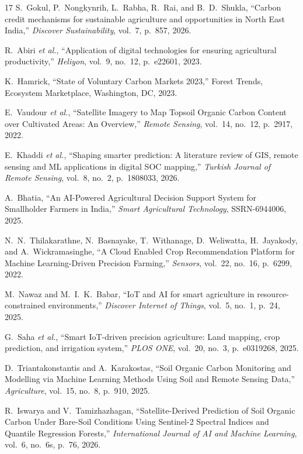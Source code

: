 \documentclass[10pt,a4paper,twocolumn]{IEEEtran}
\begin{document}
\begin{thebibliography}{17}
S.~Gokul, P.~Nongkynrih, L.~Rabha, R.~Rai, and B.~D.~Shukla, ``Carbon credit mechanisms for sustainable agriculture and opportunities in North East India,'' \emph{Discover Sustainability}, vol.~7, p.~857, 2026.

R.~Abiri \emph{et al.}, ``Application of digital technologies for ensuring agricultural productivity,'' \emph{Heliyon}, vol.~9, no.~12, p.~e22601, 2023.

K.~Hamrick, ``State of Voluntary Carbon Markets 2023,'' Forest Trends, Ecosystem Marketplace, Washington, DC, 2023.

E.~Vaudour \emph{et al.}, ``Satellite Imagery to Map Topsoil Organic Carbon Content over Cultivated Areas: An Overview,'' \emph{Remote Sensing}, vol.~14, no.~12, p.~2917, 2022.

E.~Khaddi \emph{et al.}, ``Shaping smarter prediction: A literature review of GIS, remote sensing and ML applications in digital SOC mapping,'' \emph{Turkish Journal of Remote Sensing}, vol.~8, no.~2, p.~1808033, 2026.

A.~Bhatia, ``An AI-Powered Agricultural Decision Support System for Smallholder Farmers in India,'' \emph{Smart Agricultural Technology}, SSRN-6944006, 2025.

N.~N.~Thilakarathne, N.~Basnayake, T.~Withanage, D.~Weliwatta, H.~Jayakody, and A.~Wickramasinghe, ``A Cloud Enabled Crop Recommendation Platform for Machine Learning-Driven Precision Farming,'' \emph{Sensors}, vol.~22, no.~16, p.~6299, 2022.

M.~Nawaz and M.~I.~K.~Babar, ``IoT and AI for smart agriculture in resource-constrained environments,'' \emph{Discover Internet of Things}, vol.~5, no.~1, p.~24, 2025.

G.~Saha \emph{et al.}, ``Smart IoT-driven precision agriculture: Land mapping, crop prediction, and irrigation system,'' \emph{PLOS ONE}, vol.~20, no.~3, p.~e0319268, 2025.

D.~Triantakonstantis and A.~Karakostas, ``Soil Organic Carbon Monitoring and Modelling via Machine Learning Methods Using Soil and Remote Sensing Data,'' \emph{Agriculture}, vol.~15, no.~8, p.~910, 2025.

R.~Iswarya and V.~Tamizhazhagan, ``Satellite-Derived Prediction of Soil Organic Carbon Under Bare-Soil Conditions Using Sentinel-2 Spectral Indices and Quantile Regression Forests,'' \emph{International Journal of AI and Machine Learning}, vol.~6, no.~6s, p.~76, 2026.


\end{thebibliography}
\end{document}
